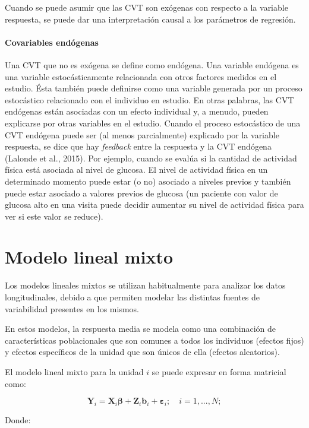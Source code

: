 \documentclass[spanish]{article}
\numberwithin{figure}{subsection}
\numberwithin{equation}{subsection}
\numberwithin{table}{subsection}
\begin{document}
Cuando se puede asumir que las CVT son exógenas con respecto a la variable
respuesta, se puede dar una interpretación causal a los parámetros de regresión.

\paragraph{Covariables endógenas} \mbox{}

Una CVT que no es exógena se define como endógena. Una variable endógena es una
variable estocásticamente relacionada con otros factores medidos en el estudio.
Ésta también puede definirse como una variable generada por un proceso
estocástico relacionado con el individuo en estudio. En otras palabras, las CVT
endógenas están asociadas con un efecto individual y, a menudo, pueden
explicarse por otras variables en el estudio. Cuando el proceso estocástico de
una CVT endógena puede ser (al menos parcialmente) explicado por la variable
respuesta, se dice que hay \textit{feedback} entre la respuesta y la CVT
endógena (Lalonde et al., 2015). Por ejemplo, cuando se evalúa si la cantidad de
actividad física está asociada al nivel de glucosa. El nivel de actividad física
en un determinado momento puede estar (o no) asociado a niveles previos y
también puede estar asociado a valores previos de glucosa (un paciente con valor
de glucosa alto en una visita puede decidir aumentar su nivel de actividad
física para ver si este valor se reduce).

\section{Modelo lineal mixto}

Los modelos lineales mixtos se utilizan habitualmente para analizar los datos
longitudinales, debido a que permiten modelar las distintas fuentes de
variabilidad presentes en los mismos.

En estos modelos, la respuesta media se modela como una combinación de
características poblacionales que son comunes a todos los individuos (efectos
fijos) y efectos específicos de la unidad que son únicos de ella (efectos
aleatorios).

El modelo lineal mixto para la unidad $i$ se puede expresar en forma matricial
como:

\[
	\bm{Y}_i = \bm{X}_i\bm{\beta} + \bm{Z}_i\bm{b}_i + \bm{\varepsilon}_i;
	\quad i = 1, ..., N;
\]

Donde:
\end{document}
